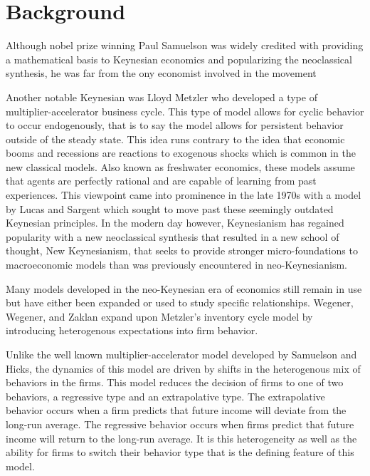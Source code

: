 \section{Background}
Although nobel prize winning Paul Samuelson was widely credited with providing a mathematical basis to Keynesian economics and popularizing the neoclassical synthesis, he was far from the ony economist involved in the movement\autocite{Skousen1997,Samuelson1939}

Another notable Keynesian was Lloyd Metzler who developed a type of multiplier-accelerator business cycle. This type of model allows for cyclic behavior to occur endogenously, that is to say the model allows for persistent behavior outside of the steady state. This idea runs contrary to the idea that economic booms and recessions are reactions to exogenous shocks which is common in the new classical models. Also known as freshwater economics, these models assume that agents are perfectly rational and are capable of learning from past experiences. This viewpoint came into prominence in the late 1970s with a model by Lucas and Sargent\autocite{Lucas1979} which sought to move past these seemingly outdated Keynesian principles. In the modern day however, Keynesianism has regained popularity with a new neoclassical synthesis that resulted in a new school of thought, New Keynesianism, that seeks to provide stronger micro-foundations to macroeconomic models than was previously encountered in neo-Keynesianism. 

Many models developed in the neo-Keynesian era of economics still remain in use but have either been expanded or used to study specific relationships. Wegener, Wegener, and Zaklan expand upon Metzler's inventory cycle model by introducing heterogenous expectations into firm behavior\autocite{Wegener2009}. 

Unlike the well known multiplier-accelerator model developed by Samuelson and Hicks, the dynamics of this model are driven by shifts in the heterogenous mix of behaviors in the firms. This model reduces the decision of firms to one of two behaviors, a regressive type and an extrapolative type. The extrapolative behavior occurs when a firm predicts that future income will deviate from the long-run average. The regressive behavior occurs when firms predict that future income will return to the long-run average. It is this heterogeneity as well as the ability for firms to switch their behavior type that is the defining feature of this model. 

